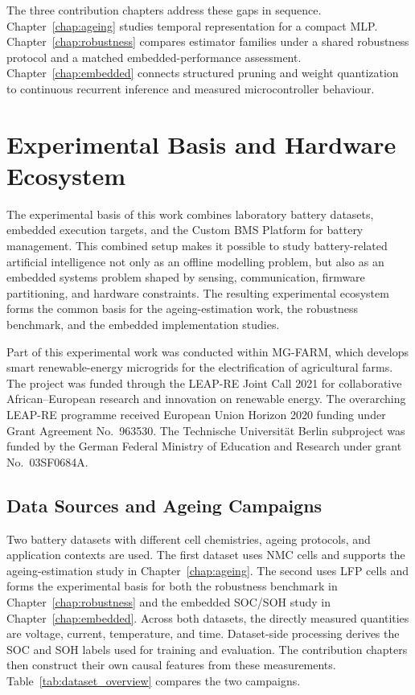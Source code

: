 \documentclass[
    a4paper,
    12pt,
    titlepage,
    bibliography=totoc,
    twoside=on,
    parskip=false,
    numbers=noenddot,
    cleardoublepage=empty,
    DIV=12,
    BCOR=12.0mm,
    headheight=36pt,
    headings=openright
]{scrreprt}
\begin{document}
The three contribution chapters address these gaps in sequence. Chapter~\ref{chap:ageing} studies temporal representation for a compact MLP. Chapter~\ref{chap:robustness} compares estimator families under a shared robustness protocol and a matched embedded-performance assessment. Chapter~\ref{chap:embedded} connects structured pruning and weight quantization to continuous recurrent inference and measured microcontroller behaviour.

\chapter{Experimental Basis and Hardware Ecosystem}
\label{chap:experimental}
The experimental basis of this work combines laboratory battery datasets, embedded execution targets, and the Custom BMS Platform for battery management. This combined setup makes it possible to study battery-related artificial intelligence not only as an offline modelling problem, but also as an embedded systems problem shaped by sensing, communication, firmware partitioning, and hardware constraints. The resulting experimental ecosystem forms the common basis for the ageing-estimation work, the robustness benchmark, and the embedded implementation studies.

Part of this experimental work was conducted within MG-FARM, which develops smart renewable-energy microgrids for the electrification of agricultural farms.\autocite{leap-reMGFARMSmart,microenergyMGFARMPoweringSustainable,technischeuniversitatberlinMGFarmSmart} The project was funded through the LEAP-RE Joint Call 2021 for collaborative African--European research and innovation on renewable energy.\autocite{leapreJointCall2021} The overarching LEAP-RE programme received European Union Horizon 2020 funding under Grant Agreement No.~963530.\autocite{europeancommissionLEAPRE2026} The Technische Universit\"at Berlin subproject was funded by the German Federal Ministry of Education and Research under grant No.~03SF0684A.\autocite{enargusMGFarm2026,rzepkaNeuralNetworkArchitecture2023a}

\section{Data Sources and Ageing Campaigns}
\label{sec:datasets}

Two battery datasets with different cell chemistries, ageing protocols, and application contexts are used. The first dataset uses NMC cells and supports the ageing-estimation study in Chapter~\ref{chap:ageing}. The second uses LFP cells and forms the experimental basis for both the robustness benchmark in Chapter~\ref{chap:robustness} and the embedded SOC/SOH study in Chapter~\ref{chap:embedded}. Across both datasets, the directly measured quantities are voltage, current, temperature, and time. Dataset-side processing derives the SOC and SOH labels used for training and evaluation. The contribution chapters then construct their own causal features from these measurements. Table~\ref{tab:dataset_overview} compares the two campaigns.
\end{document}
